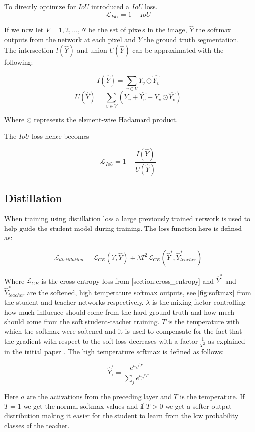 \documentclass{kththesis}
\begin{document}
To directly optimize for \(IoU\) \textcite{rahman2016optimizing} introduced
a \(IoU\) loss.
\[\mathcal{L}_{IoU} = 1 - IoU\]

If we now let \(V = {1, 2, \dots, N}\) be the set of pixels in the image, \(\hat{Y}\)
the softmax outputs from the network at each pixel and \(Y\) the ground truth
segmentation. The intersection \(I(\hat{Y})\) and union \(U(\hat{Y})\) can be
approximated with the following:

\[I(\hat{Y}) = \sum_{v \in V} Y_v \odot \hat{Y_v}\]
\[U(\hat{Y}) = \sum_{v \in V}\left( Y_v + \hat{Y_v} - Y_v \odot \hat{Y_v} \right) \]

Where \(\odot\) represents the element-wise Hadamard product.

The \(IoU\) loss hence becomes

\[\mathcal{L}_{IoU} = 1 - \frac{I(\hat{Y})}{U(\hat{Y})}\]


\subsection{Distillation}
When training using distillation loss \parencite{hinton2015distilling} a large
previously trained network is used to help guide the student model during
training. The loss function here is defined as:

\[\mathcal{L}_{distillation} = \mathcal{L}_{CE}(Y, \hat{Y}) + \lambda T^2\mathcal{L}_{CE}(\hat{Y}^*, \hat{Y}_{teacher}^*)\]

Where \(\mathcal{L}_{CE}\) is the cross entropy loss from
\cref{section:cross_entropy} and \(\hat{Y}^*\) and \(\hat{Y}^*_{teacher}\) are the softened,
high temperature softmax outputs, see \cref{fig:softmax} from the student and teacher networks
respectively. \(\lambda\) is the mixing factor controlling how much influence
should come from the hard ground truth and how much should come from the soft
student-teacher training. \(T\) is the temperature with which the softmax were softened and
it is used to compensate for the fact that the gradient with respect to the soft
loss decreases with a factor \(\frac{1}{T^2}\) as explained in the initial
paper \parencite{hinton2015distilling}. The high temperature softmax is defined
as follows: 

\[\hat{Y}_i^* = \frac{e^{a_i/T}}{\sum_j e^{a_j/T}}\]

Here \(a\) are the activations from the preceding layer and \(T\) is the
temperature. If \(T = 1\) we get the normal softmax values and if \(T > 0\) we
get a softer output distribution making it easier for the student to learn from
the low probability classes of the teacher. 
\end{document}
